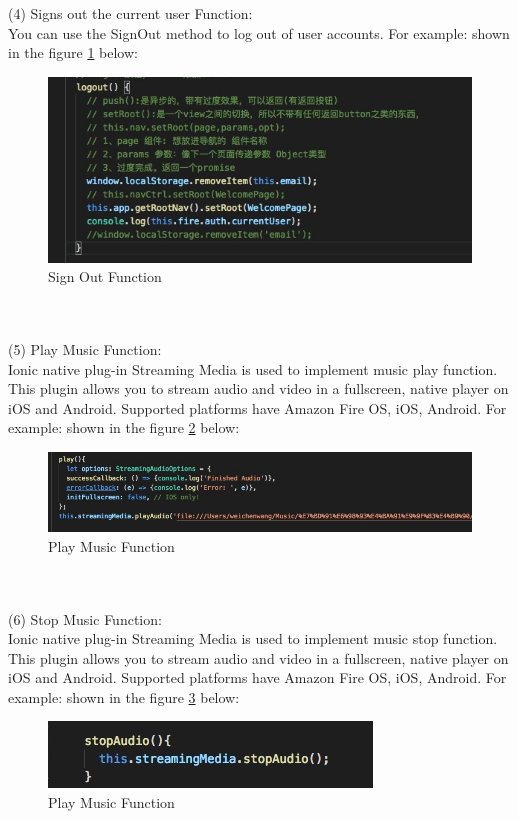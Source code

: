 (4) Signs out the current user Function: \\
You can use the SignOut method to log out of user accounts. For example: shown in the figure \ref{fig:6.16 cubed graph} below:
\begin{figure}[h]
	\centering
	\includegraphics[scale=0.4]{img/logout.png}
	\caption{Sign Out Function}
	\label{fig:6.16 cubed graph}
\end{figure}
\\ \\
(5) Play Music Function: \\
Ionic native plug-in Streaming Media is used to implement music play function. This plugin allows you to stream audio and video in a fullscreen, native player on iOS and Android. Supported platforms have Amazon Fire OS, iOS, Android. For example: shown in the figure \ref{fig:6.17 cubed graph} below:
\begin{figure}[h]
	\centering
	\includegraphics[scale=0.4]{img/playAudio.png}
	\caption{Play Music Function}
	\label{fig:6.17 cubed graph}
\end{figure}
\\ \\
(6) Stop Music Function: \\
Ionic native plug-in Streaming Media is used to implement music stop function. This plugin allows you to stream audio and video in a fullscreen, native player on iOS and Android. Supported platforms have Amazon Fire OS, iOS, Android. For example: shown in the figure
\ref{fig:6.18 cubed graph} below:
\begin{figure}[h]
	\centering
	\includegraphics[scale=0.4]{img/stopAudio.png}
	\caption{Play Music Function}
	\label{fig:6.18 cubed graph}
\end{figure}
